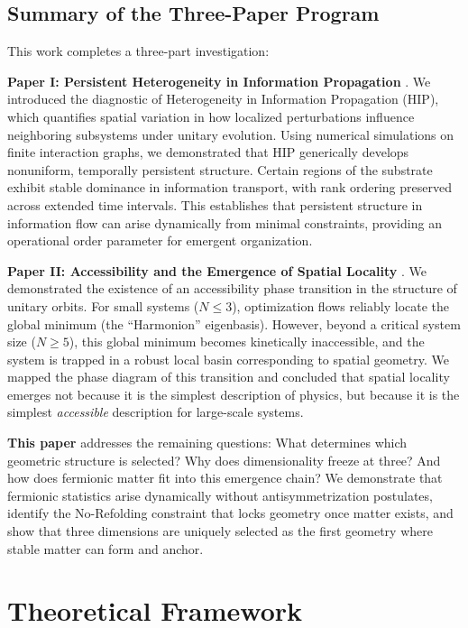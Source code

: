 \documentclass[11pt]{article}
\begin{document}
\subsection{Summary of the Three-Paper Program}

This work completes a three-part investigation:

\textbf{Paper I: Persistent Heterogeneity in Information Propagation} \cite{HSF1}. We introduced the diagnostic of Heterogeneity in Information Propagation (HIP), which quantifies spatial variation in how localized perturbations influence neighboring subsystems under unitary evolution. Using numerical simulations on finite interaction graphs, we demonstrated that HIP generically develops nonuniform, temporally persistent structure. Certain regions of the substrate exhibit stable dominance in information transport, with rank ordering preserved across extended time intervals. This establishes that persistent structure in information flow can arise dynamically from minimal constraints, providing an operational order parameter for emergent organization.

\textbf{Paper II: Accessibility and the Emergence of Spatial Locality} \cite{HSF2}. We demonstrated the existence of an accessibility phase transition in the structure of unitary orbits. For small systems ($N \leq 3$), optimization flows reliably locate the global minimum (the ``Harmonion'' eigenbasis). However, beyond a critical system size ($N \geq 5$), this global minimum becomes kinetically inaccessible, and the system is trapped in a robust local basin corresponding to spatial geometry. We mapped the phase diagram of this transition and concluded that spatial locality emerges not because it is the simplest description of physics, but because it is the simplest \emph{accessible} description for large-scale systems.

\textbf{This paper} addresses the remaining questions: What determines which geometric structure is selected? Why does dimensionality freeze at three? And how does fermionic matter fit into this emergence chain? We demonstrate that fermionic statistics arise dynamically without antisymmetrization postulates, identify the No-Refolding constraint that locks geometry once matter exists, and show that three dimensions are uniquely selected as the first geometry where stable matter can form and anchor.

\section{Theoretical Framework}
\end{document}
